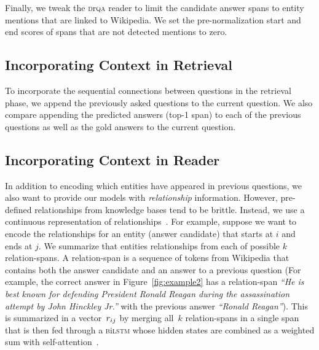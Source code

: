 Finally, we tweak the \textsc{d}r\textsc{qa} reader to limit the candidate answer spans
to entity mentions that are linked to Wikipedia.
We
set the pre-normalization start and end
scores of spans that are not detected mentions to zero.




\subsection{Incorporating Context in Retrieval}

To incorporate the sequential connections between questions in the
retrieval phase, we append the previously asked questions to
the current question. We also compare appending the predicted answers
(top-1 span) to each of the previous questions as well as the gold answers
to the current question.

\subsection{Incorporating Context in Reader}


In addition to encoding which entities have appeared in previous
questions, we also want to provide our models with \emph{relationship}
information.  However, pre-defined relationships from knowledge bases
tend to be brittle.  Instead, we use a continuous representation of
relationships~\cite{iyyer2016Feuding}.  For example, suppose we want
to encode the relationships for an entity (answer candidate) that
starts at $i$ and ends at $j$. We summarize that entities
relationships from each of possible $k$ relation-spans.  A
relation-span is a sequence of tokens from Wikipedia that contains
both the answer candidate and an answer to a previous question (For
example, the correct answer in Figure~\ref{fig:example2} has a
relation-span \textit{``He is best known for defending President
  Ronald Reagan during the assassination attempt by John Hinckley
  Jr.''} with the previous answer \textit{``Ronald Reagan''}).  This
is summarized in a vector~$\*r_{ij}$ by merging all~$k$ relation-spans
in a single span that is then fed through a \textsc{b}i\textsc{lstm}
whose hidden states are combined as a weighted sum with
self-attention~\cite{lin2017structured}.

